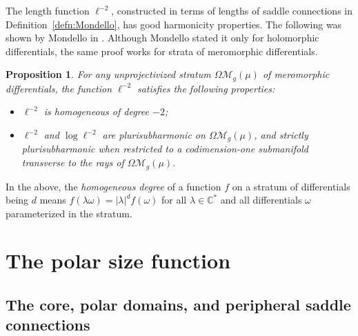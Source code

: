 \documentclass[11]{amsart}
\theoremstyle{plain}
\newtheorem{proposition}[theorem]{Proposition}
\theoremstyle{definition}
\begin{document}
The length function $\ell^{-2}$, constructed in terms of lengths of saddle connections in Definition~\ref{defn:Mondello}, has good harmonicity properties. The following was shown by Mondello in \cite[Lemma 3.15]{Mondello}. Although Mondello stated it only for holomorphic differentials, the same proof works for strata of meromorphic differentials. 

\begin{proposition}\label{prop:Mondello}
For any unprojectivized stratum $\Omega\mathcal M_g(\mu)$ of meromorphic differentials, the function $\ell^{-2}$ satisfies the following properties:
\begin{itemize}
\item[(i)] $\ell^{-2}$ is homogeneous of degree $-2$;
\item[(ii)] $\ell^{-2}$ and $\log \ell^{-2}$ are plurisubharmonic on $\Omega\mathcal M_g(\mu)$, and strictly plurisubharmonic when restricted to a codimension-one submanifold transverse to the rays of $\Omega\mathcal M_g(\mu)$.
\end{itemize} 
\end{proposition}

In the above, the {\em homogeneous degree} of a function $f$ on a stratum of differentials being $d$ means 
$f(\lambda \omega) = |\lambda|^{d} f(\omega)$ for all $\lambda\in \mathbb C^{*}$ and all differentials $\omega$ parameterized in the stratum.  

\section{The polar size function}\label{sub:PolarSize}

\subsection{The core, polar domains, and peripheral saddle connections}\label{sub:CorePolarDomain}
\end{document}
